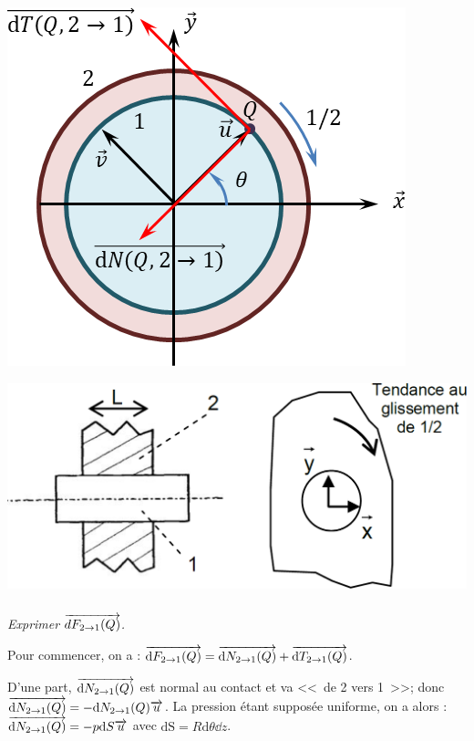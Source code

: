 \documentclass[10pt,fleqn]{article} %
\begin{document}
\begin{multicols}{2}
\begin{multicols}{2}
\begin{corrige}
\begin{center}
\includegraphics[width=.8\linewidth]{images/cor_02}
\end{center}

\end{corrige}
\else
\fi



\begin{center}
\includegraphics[width=.9\linewidth]{images/fig_05}
\end{center}

\subparagraph{}
\textit{Exprimer $\overrightarrow{dF_{2\rightarrow 1}(Q)}$.}

\ifprof
\begin{corrige}
Pour commencer, on a : $\overrightarrow{\text{d}F_{2\rightarrow 1}(Q)} = \overrightarrow{\text{d}N_{2\rightarrow 1}(Q)}+\overrightarrow{\text{d}T_{2\rightarrow 1}(Q)}$. 

D'une part, $\overrightarrow{\text{d}N_{2\rightarrow 1}(Q)}$ est normal au contact et va <<~de 2 vers 1~>>; donc $\overrightarrow{\text{d}N_{2\rightarrow 1}(Q)}=-\text{d}N_{2\rightarrow 1}(Q)\overrightarrow{u}$. La pression étant supposée uniforme, on a alors : $\overrightarrow{\text{d}N_{2\rightarrow 1}(Q)}=-p\text{d}S\overrightarrow{u}$ avec $\text{dS} = R\text{d}\theta \dd z$. 


\end{corrige}
\end{multicols}
\end{multicols}
\end{document}
